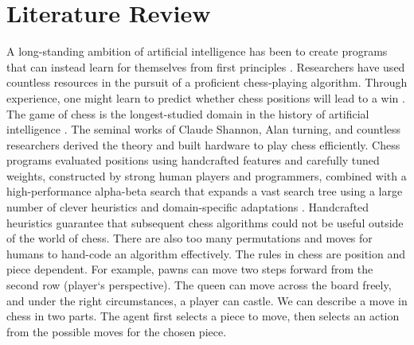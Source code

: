 \documentclass[12pt]{turabian-researchpaper}
\begin{document}

\section{Literature Review}

A long-standing ambition of artificial intelligence has been to create programs that can instead learn for themselves from first principles \parencite{silver_general_2018}. Researchers have used countless resources in the pursuit of a proficient chess-playing algorithm. Through experience, one might learn to predict whether chess positions will lead to a win \parencite{sutton1988learning}. The game of chess is the longest-studied domain in the history of artificial intelligence \parencite{silver_general_2018}. The seminal works of Claude Shannon, Alan turning, and countless researchers derived the theory and built hardware to play chess efficiently. Chess programs evaluated positions using handcrafted features and carefully tuned weights, constructed by strong human players and programmers, combined with a high-performance alpha-beta search that expands a vast search tree using a large number of clever heuristics and domain-specific adaptations \parencite{silver_general_2018}. Handcrafted heuristics guarantee that subsequent chess algorithms could not be useful outside of the world of chess. There are also too many permutations and moves for humans to hand-code an algorithm effectively. The rules in chess are position and piece dependent. For example, pawns can move two steps forward from the second row (player‘s perspective). The queen can move across the board freely, and under the right circumstances, a player can castle. We can describe a move in chess in two parts. The agent first selects a piece to move, then selects an action from the possible moves for the chosen piece.
\end{document}
